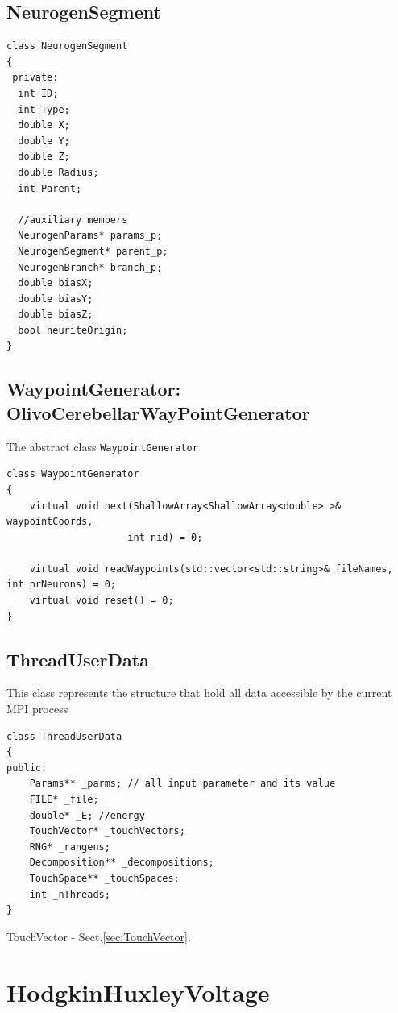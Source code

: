\subsection{NeurogenSegment}
\label{sec:NeurogenSegment}

\begin{verbatim}
class NeurogenSegment
{
 private:
  int ID;
  int Type;
  double X;
  double Y;
  double Z;
  double Radius;
  int Parent;

  //auxiliary members
  NeurogenParams* params_p;
  NeurogenSegment* parent_p;
  NeurogenBranch* branch_p;
  double biasX;
  double biasY;
  double biasZ;
  bool neuriteOrigin;
}
\end{verbatim}

\subsection{WaypointGenerator: OlivoCerebellarWayPointGenerator}


The abstract class \verb!WaypointGenerator!

\begin{verbatim}
class WaypointGenerator
{
    virtual void next(ShallowArray<ShallowArray<double> >& waypointCoords, 
                     int nid) = 0;

    virtual void readWaypoints(std::vector<std::string>& fileNames, int nrNeurons) = 0;
    virtual void reset() = 0;
}
\end{verbatim}


\subsection{ThreadUserData}
\label{sec:ThreadUserData}

This class represents the structure that hold all data accessible by the current
MPI process

\begin{lstlisting}
class ThreadUserData
{
public:
	Params** _parms; // all input parameter and its value
	FILE* _file; 
	double* _E; //energy
	TouchVector* _touchVectors;
	RNG* _rangens;
	Decomposition** _decompositions;
	TouchSpace** _touchSpaces;
	int _nThreads;
}
\end{lstlisting}
TouchVector - Sect.\ref{sec:TouchVector}.



\section{HodgkinHuxleyVoltage}
\label{sec:HodgkinHuxleyVoltage}


